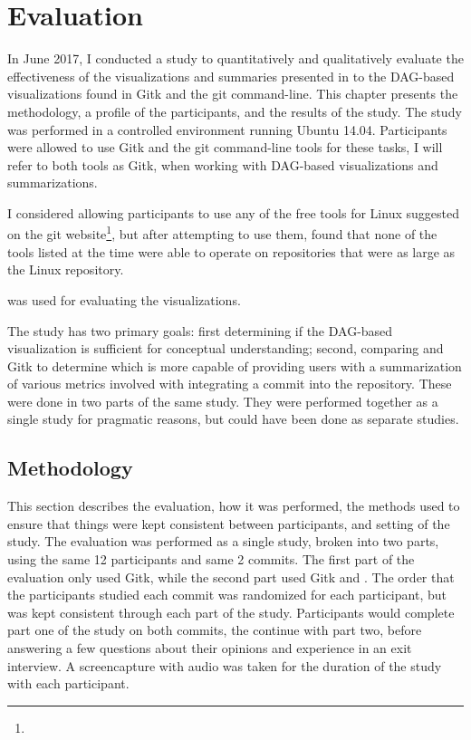 \chapter{Evaluation}\label{chap:evaluation}

In June 2017, I conducted a study to quantitatively and qualitatively
evaluate the effectiveness of the visualizations and summaries presented
in \tool{} to the DAG-based visualizations found in Gitk and the git
command-line. This chapter presents the methodology, a profile of the
participants, and the results of the study. The study was performed in a
controlled environment running Ubuntu 14.04. Participants were allowed
to use Gitk and the git command-line tools for these tasks, I will refer
to both tools as Gitk, when working with DAG-based visualizations and
summarizations.

I considered allowing participants to use any of the
free tools for Linux suggested on the git website\footnote{}, but
after attempting to use them, found that none of the tools listed at
the time were able to operate on repositories that were as large as
the Linux repository.

\tool{} was used for evaluating the  visualizations.

The study has two primary goals: first determining if the DAG-based
visualization is sufficient for conceptual understanding; second,
comparing \tool and Gitk to determine which is more capable of providing
users with a summarization of various metrics involved with integrating
a commit into the repository. These were done in two parts of the same
study. They were performed together as a single study for pragmatic
reasons, but could have been done as separate studies.

\section{Methodology}\label{sec:methodology}

This section describes the evaluation, how it was performed, the methods
used to ensure that things were kept consistent between participants,
and setting of the study. The evaluation was performed as a single
study, broken into two parts, using the same 12 participants and same 2
commits. The first part of the evaluation only used Gitk, while the
second part used Gitk and \tool{}. The order that the participants
studied each commit was randomized for each participant, but was kept
consistent through each part of the study. Participants would complete
part one of the study on both commits, the continue with part two, before
answering a few questions about their opinions and experience in an exit
interview. A screencapture with audio was taken for the duration of the
study with each participant.

